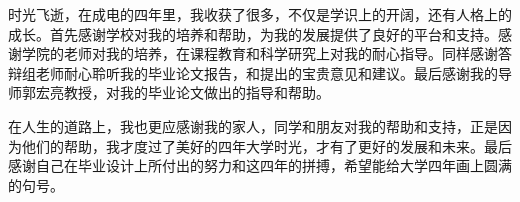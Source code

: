 \documentclass{standalone}
\begin{document}
\thesisacknowledgement
时光飞逝，在成电的四年里，我收获了很多，不仅是学识上的开阔，还有人格上的成长。首先感谢学校对我的培养和帮助，为我的发展提供了良好的平台和支持。感谢学院的老师对我的培养，在课程教育和科学研究上对我的耐心指导。同样感谢答辩组老师耐心聆听我的毕业论文报告，和提出的宝贵意见和建议。最后感谢我的导师郭宏亮教授，对我的毕业论文做出的指导和帮助。\par
在人生的道路上，我也更应感谢我的家人，同学和朋友对我的帮助和支持，正是因为他们的帮助，我才度过了美好的四年大学时光，才有了更好的发展和未来。最后感谢自己在毕业设计上所付出的努力和这四年的拼搏，希望能给大学四年画上圆满的句号。
\end{document}
